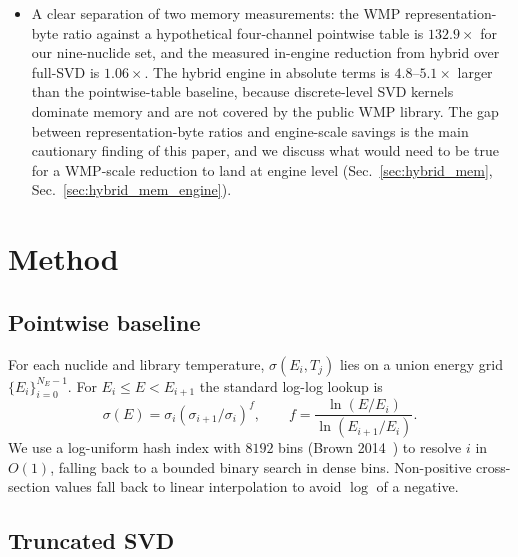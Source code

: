 \documentclass[11pt,a4paper]{article}
\begin{document}
\begin{itemize}
  $-1$~pcm (Sec.~\ref{sec:offset}).
\item A clear separation of two memory measurements: the
  WMP representation-byte ratio against a hypothetical
  four-channel pointwise table is $132.9\times$ for our
  nine-nuclide set, and the measured in-engine reduction
  from hybrid over full-SVD is $1.06\times$. The hybrid
  engine in absolute terms is $4.8$--$5.1\times$ larger than
  the pointwise-table baseline, because discrete-level SVD
  kernels dominate memory and are not covered by the public
  WMP library. The gap between representation-byte ratios
  and engine-scale savings is the main cautionary finding of
  this paper, and we discuss what would need to be true for
  a WMP-scale reduction to land at engine level
  (Sec.~\ref{sec:hybrid_mem}, Sec.~\ref{sec:hybrid_mem_engine}).
\end{itemize}

\section{Method}
\label{sec:method}

\subsection{Pointwise baseline}

For each nuclide and library temperature, $\sigma(E_i, T_j)$
lies on a union energy grid $\{E_i\}_{i=0}^{N_E - 1}$. For
$E_i \leq E < E_{i+1}$ the standard log-log lookup is
\begin{equation}
\sigma(E) = \sigma_i
\left(\sigma_{i+1}/\sigma_i\right)^{f},
\qquad
f = \frac{\ln(E/E_i)}{\ln(E_{i+1}/E_i)}.
\label{eq:loglog}
\end{equation}
We use a log-uniform hash index with $8192$ bins
(Brown 2014~\cite{brown2014hash}) to resolve $i$ in $O(1)$,
falling back to a bounded binary search in dense bins.
Non-positive cross-section values fall back to linear
interpolation to avoid $\log$ of a negative.

\subsection{Truncated SVD}
\end{document}
